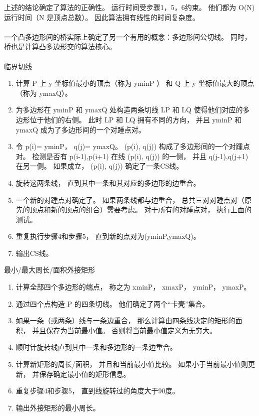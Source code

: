 上述的结论确定了算法的正确性。 运行时间受步骤1，5，6约束。 他们都为 O(N) 运行时间（N 是顶点总数）。 因此算法拥有线性的时间复杂度。\\
\\
一个凸多边形间的桥实际上确定了另一个有用的概念：多边形间公切线。 同时， 桥也是计算凸多边形交的算法核心。\\
\\
临界切线\\
\begin{enumerate}
\item 计算 P 上 y 坐标值最小的顶点（称为 yminP ） 和 Q 上 y 坐标值最大的顶点（称为 ymaxQ）。
\item 为多边形在 yminP 和 ymaxQ 处构造两条切线 LP 和 LQ 使得他们对应的多边形位于他们的右侧。 此时 LP 和 LQ 拥有不同的方向， 并且 yminP 和 ymaxQ 成为了多边形间的一个对踵点对。
\item 令 p(i)= yminP， q(j)= ymaxQ。 (p(i), q(j)) 构成了多边形间的一个对踵点对。 检测是否有 p(i-1),p(i+1) 在线 (p(i), q(j)) 的一侧， 并且 q(j-1),q(j+1) 在另一侧。 如果成立， (p(i), q(j)) 确定了一条CS线。
\item 旋转这两条线， 直到其中一条和其对应的多边形的边重合。
\item 一个新的对踵点对确定了。 如果两条线都与边重合， 总共三对对踵点对（原先的顶点和新的顶点的组合）需要考虑。 对于所有的对踵点对， 执行上面的测试。
\item 重复执行步骤4和步骤5， 直到新的点对为(yminP,ymaxQ)。
\item 输出CS线。 
\end{enumerate}
最小/最大周长/面积外接矩形\\
\begin{enumerate}
\item 计算全部四个多边形的端点， 称之为 xminP， xmaxP， yminP， ymaxP。
\item 通过四个点构造 P 的四条切线。 他们确定了两个“卡壳”集合。
\item 如果一条（或两条）线与一条边重合， 那么计算由四条线决定的矩形的面积， 并且保存为当前最小值。 否则将当前最小值定义为无穷大。
\item 顺时针旋转线直到其中一条和多边形的一条边重合。
\item 计算新矩形的周长/面积， 并且和当前最小值比较。 如果小于当前最小值则更新， 并保存确定最小值的矩形信息。
\item 重复步骤4和步骤5， 直到线旋转过的角度大于90度。
\item 输出外接矩形的最小周长。 
\end{enumerate}
